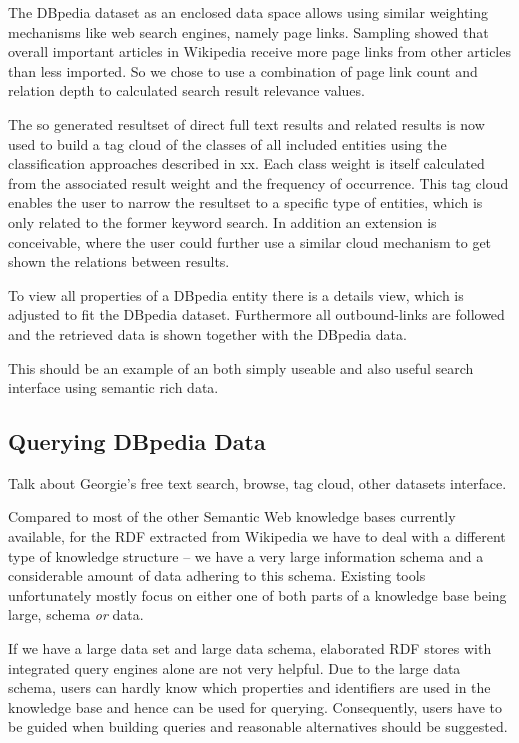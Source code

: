 \documentclass{llncs}
\begin{document}
The DBpedia dataset as an enclosed data space allows using similar weighting mechanisms like web search engines, namely page links. Sampling showed that overall important articles in Wikipedia receive more page links from other articles than less imported. So we chose to use a combination of page link count and relation depth to calculated search result relevance values.

The so generated resultset of direct full text results and related results is now used to build a tag cloud of the classes of all included entities using the classification approaches described in xx. Each class weight is itself calculated from the associated result weight and the frequency of occurrence. This tag cloud enables the user to narrow the resultset to a specific type of entities, which is only related to the former keyword search. In addition an extension is conceivable, where the user could further use a similar cloud mechanism to get shown the relations between results.

To view all properties of a DBpedia entity there is a details view, which is adjusted to fit the DBpedia dataset. Furthermore all outbound-links are followed and the retrieved data is shown together with the DBpedia data.

This should be an example of an both simply useable and also useful search interface using semantic rich data.


\subsection{Querying DBpedia Data}

Talk about Georgie's free text search, browse, tag cloud, other datasets interface.

Compared to most of the other Semantic Web knowledge bases currently available, for the RDF extracted from Wikipedia we have to deal with a different type of knowledge structure \--- we have a very large information schema and a considerable amount of data adhering to this schema. Existing tools unfortunately mostly focus on either one of both parts of a knowledge base being large, schema \textit{or} data.

If we have a large data set and large data schema, elaborated RDF stores with integrated query engines alone are not very helpful. Due to the large data schema, users can hardly know which properties and identifiers are used in the knowledge base and hence can be used for querying. Consequently, users have to be guided when building queries and reasonable alternatives should be suggested.
\end{document}
